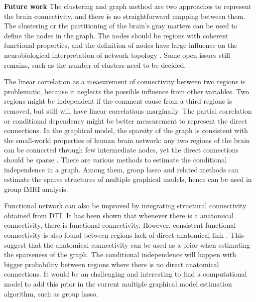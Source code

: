 \documentclass[]{article}
\begin{document}
\textbf{Future work} The clustering and graph method are two approaches to
represent the brain connectivity, and there is no straightforward mapping
between them. The clustering or the partitioning of the brain's gray matters can
be used to define the nodes in the graph. The nodes should be regions with
coherent functional properties, and the definition of nodes have large influence
on the neurobiological interpretation of network topology
\cite{butts2009revisiting}. Some open issues still remains, such as the number
of clusters need to be decided.


The linear correlation as a measurement of connectivity
between two regions is problematic, because it neglects the possible influence
from other variables. Two regions might be independent if the comment cause from
a third regions is removed, but still will have linear correlations
marginally. The partial correlation or conditional dependency might be better
measurement to represent the direct connections. In the graphical model, the
sparsity of the graph is consistent with the small-world properties of human
brain network: any two regions of the brain can be connected through few
intermediate nodes, yet the direct connections should be sparse
\citep{varoquaux2010brain}. There are various methods to estimate the
conditional independence in a graph. Among them, group lasso
\cite{yuan2006model} and related methods can estimate the sparse structures of
multiple graphical models, hence can be used in group fMRI analysis.

Functional network can also be improved by integrating structural
connectivity obtained from DTI. It has been shown that whenever there is a anatomical
connectivity, there is functional connectivity. However, consistent functional
connectivity is also found between regions lack of direct anatomical link
\citep{deco2010emerging}. This suggest that the anatomical connectivity can be
used as a prior when estimating the sparseness of the graph. The conditional
independence will happen with bigger probability between regions where there is
no direct anatomical connections. It would be an challenging and interesting to
find a computational model to add this prior in the current multiple graphical
model estimation algorithm, such as group lasso.



\end{document}
